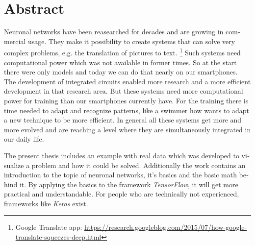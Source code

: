\chapter{Abstract}

\begin{english} 
Neuronal networks have been reasearched for decades and are growing in commercial usage. 
They make it possibility to create systems that can solve very complex problems, e.g. the translation of pictures to text. \footnote{Google Translate app: \url{https://research.googleblog.com/2015/07/how-google-translate-squeezes-deep.html}} 
Such systems need computational power which was not available in former times. 
So at the start there were only models and today we can do that nearly on our smartphones. 
The development of integrated circuits enabled more research and a more efficient development in that research area. 
But these systems need more computational power for training than our smartphones currently have. 
For the training there is time needed to adapt and recognize patterns, like a swimmer how wants to adapt a new technique to be more efficient. 
In general all these systems get more and more evolved and are reaching a level where they are simultaneously integrated in our daily life. 

\noindent
The present thesis includes an example with real data which was developed to visualize a problem and how it could be solved. 
Additionally the work contains an introduction to the topic of neuronal networks, it's basics and the basic math behind it. 
By applying the basics to the framework \textit{TensorFlow}, it will get more practical and understandable. 
For people who are technically not experienced, frameworks like \textit{Keras} exist. 
\end{english}
